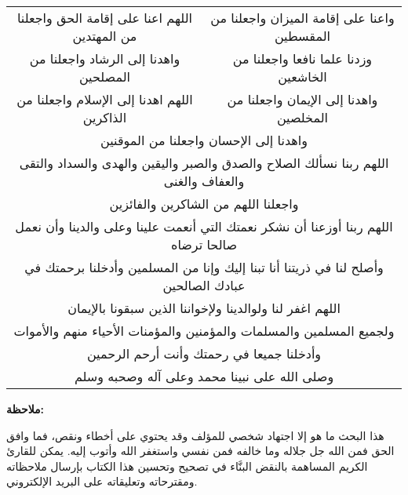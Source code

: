 \begin{center}
\begin{tabular}{cc}
    اللهم اعنا على إقامة الحق واجعلنا من المهتدين & 
    واعنا على إقامة الميزان واجعلنا من المقسطين  \\
    واهدنا إلى الرشاد واجعلنا من المصلحين & 
    وزدنا علما نافعا واجعلنا من الخاشعين \\
    اللهم اهدنا إلى الإسلام واجعلنا من الذاكرين & 
    واهدنا إلى الإيمان واجعلنا من المخلصين \\
    \multicolumn{2}{c}{واهدنا إلى الإحسان واجعلنا من الموقنين} \\
    \multicolumn{2}{c}{اللهم ربنا نسألك الصلاح والصدق والصبر واليقين والهدى والسداد والتقى والعفاف والغنى} \\
    \multicolumn{2}{c}{واجعلنا اللهم من الشاكرين والفائزين} \\
    \multicolumn{2}{c}{اللهم ربنا أوزعنا أن نشكر نعمتك التي أنعمت علينا وعلى والدينا وأن نعمل صالحا ترضاه} \\
    \multicolumn{2}{c}{وأصلح لنا في ذريتنا أنا تبنا إليك وإنا من المسلمين وأدخلنا برحمتك في عبادك الصالحين} \\
    \multicolumn{2}{c}{اللهم اغفر لنا ولوالدينا ولإخواننا الذين سبقونا بالإيمان} \\
    \multicolumn{2}{c}{ولجميع المسلمين والمسلمات والمؤمنين والمؤمنات الأحياء منهم والأموات} \\
    \multicolumn{2}{c}{وأدخلنا جميعا في رحمتك وأنت أرحم الرحمين} \\
    \multicolumn{2}{c}{وصلى الله على نبينا محمد وعلى آله وصحبه وسلم} \\
\end{tabular}
\end{center}

\newpage
\vspace*{\fill}
\textbf{ملاحظة:}

هذا البحث ما هو إلا اجتهاد شخصي للمؤلف وقد يحتوي على أخطاء ونقص، فما وافق الحق فمن الله جل جلاله وما خالفه فمن نفسي واستغفر الله وأتوب إليه. يمكن للقارئ الكريم المساهمة بالنقض البنَّاء في تصحيح وتحسين هذا الكتاب بإرسال ملاحظاته ومقترحاته وتعليقاته على البريد الإلكتروني.
